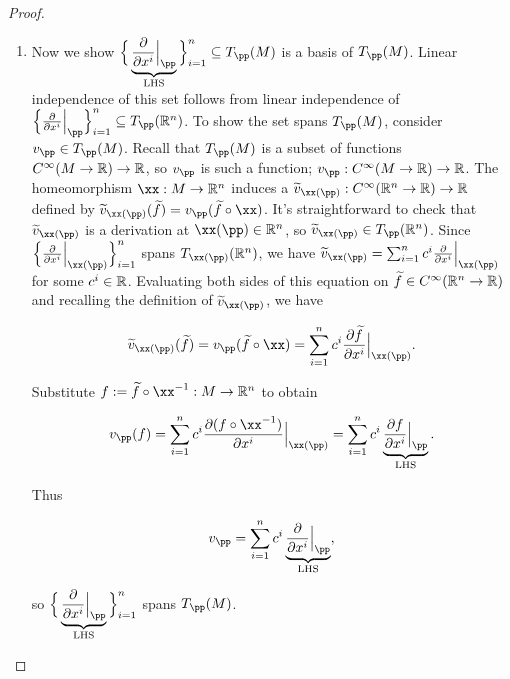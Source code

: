 \begin{proof}
\begin{enumerate}
        \item Now we show $\Big\{ \pdxiLHS \Big\}_{i = 1}^n \subseteq T_\pp(M)$ is a basis of $T_\pp(M)$. Linear independence of this set follows from linear independence of $\Big\{ \frac{\pd}{\pd x^i}\Big|_\pp \Big\}_{i = 1}^n \subseteq T_\pp(\R^n)$. To show the set spans $T_\pp(M)$, consider $v_\pp \in T_\pp(M)$. Recall that $T_\pp(M)$ is a subset of functions $C^\infty(M \rightarrow \mathbb{R}) \rightarrow \mathbb{R}$, so $v_\pp$ is such a function; $v_\pp:C^\infty(M \rightarrow \R) \rightarrow \R$. The homeomorphism $\xx:M \rightarrow \R^n$ induces a $\widetilde{v}_{\xx(\pp)}:C^\infty(\R^n \rightarrow \R) \rightarrow \R$ defined by $\widetilde{v}_{\xx(\pp)}(\widetilde{f}) = v_\pp(\widetilde{f} \circ \xx)$. It's straightforward to check that $\widetilde{v}_{\xx(\pp)}$ is a derivation at $\xx(\pp) \in \R^n$, so $\widetilde{v}_{\xx(\pp)} \in T_\pp(\R^n)$. Since $\Big\{ \frac{\pd}{\pd x^i}\Big|_{\xx(\pp)} \Big\}_{i = 1}^n$ spans $T_{\xx(\pp)}(\R^n)$, we have $\widetilde{v}_{\xx(\pp)} = \sum_{i = 1}^n c^i \frac{\pd}{\pd x^i}\Big|_{\xx(\pp)}$ for some $c^i \in \mathbb{R}$. Evaluating both sides of this equation on $\widetilde{f} \in C^\infty(\mathbb{R}^n \rightarrow \mathbb{R})$ and recalling the definition of $\widetilde{v}_{\xx(\pp)}$, we have

        \begin{align*}
            \widetilde{v}_{\xx(\pp)}(\widetilde{f}) = v_\pp(\widetilde{f} \circ \xx) = \sum_{i = 1}^n c^i \frac{\pd \widetilde{f}}{\pd x^i}\Big|_{\xx(\pp)}.
        \end{align*}
    
        Substitute $f := \widetilde{f} \circ \xx^{-1}:M \rightarrow \R^n$ to obtain
    
        \begin{align*}
            v_\pp(f) = \sum_{i = 1}^n c^i \frac{\pd (f \circ \xx^{-1})}{\pd x^i}\Big|_{\xx(\pp)} = \sum_{i = 1}^n c^i \underbrace{\frac{\pd f}{\pd x^i}\Big|_\pp}_{\text{LHS}}.
        \end{align*}
    
        Thus
    
        \begin{align*}
            v_\pp = \sum_{i = 1}^n c^i \pdxiLHS,
        \end{align*}
        
        so $\Big\{ \pdxiLHS \Big\}_{i = 1}^n$ spans $T_\pp(M)$.
    \end{enumerate} 
\end{proof}

